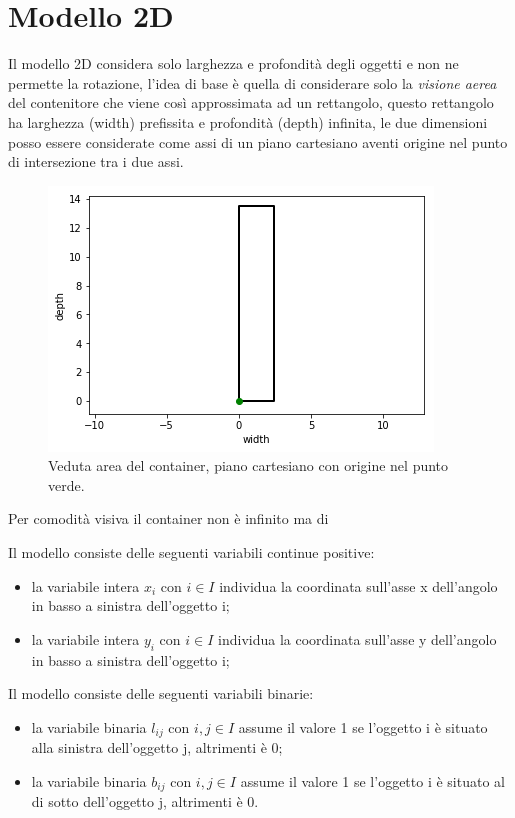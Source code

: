 \section{Modello 2D}
Il modello 2D considera solo larghezza e profondità degli oggetti e non ne permette la rotazione, l'idea di base è quella di considerare solo la \textit{visione aerea} del contenitore che viene così approssimata ad un rettangolo, questo rettangolo ha larghezza (width) prefissita e profondità (depth) infinita, le due dimensioni posso essere considerate come assi di un piano cartesiano aventi origine nel punto di intersezione tra i due assi.\\
\begin{figure}[!h]
	\begin{center} \includegraphics[scale=0.6]{figures/cartesian_wd}
		\caption[Veduta area - piano cartesiano]{Veduta area del container, piano cartesiano con origine nel punto verde.}  
		\label{fig:myInlineFigure}
	\end{center}
\end{figure}

\noindent Per comodità visiva il container non è infinito ma di

\noindent Il modello consiste delle seguenti variabili continue positive:
\begin{itemize}
	\item la variabile intera $x_{i}$ con $i \in I$ individua la coordinata sull'asse x dell'angolo in basso a sinistra dell'oggetto i;
	\item la variabile intera $y_{i}$ con $i \in I$ individua la coordinata sull'asse y dell'angolo in basso a sinistra dell'oggetto i;
\end{itemize}
Il modello consiste delle seguenti variabili binarie:
\begin{itemize}
	\item la variabile binaria $l_{ij}$ con $i,j \in I$ assume il valore 1 se l'oggetto i è situato alla sinistra dell'oggetto j, altrimenti è 0;
	\item la variabile binaria $b_{ij}$ con $i,j \in I$ assume il valore 1 se l'oggetto i è situato al di sotto dell'oggetto j, altrimenti è 0.
\end{itemize}

